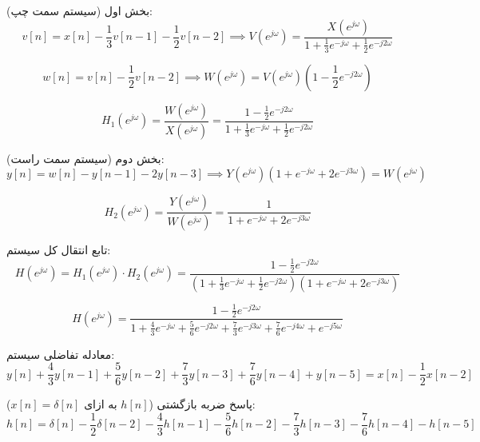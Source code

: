 {بخش اول (سیستم سمت چپ):}
\[v[n] = x[n] - \frac{1}{3}v[n-1] - \frac{1}{2}v[n-2] \implies V(e^{j\omega}) = \frac{X(e^{j\omega})}{1 + \frac{1}{3}e^{-j\omega} + \frac{1}{2}e^{-j2\omega}}\]

\[w[n] = v[n] - \frac{1}{2}v[n-2] \implies W(e^{j\omega}) = V(e^{j\omega}) \left(1 - \frac{1}{2}e^{-j2\omega}\right)\]

\[H_1(e^{j\omega}) = \frac{W(e^{j\omega})}{X(e^{j\omega})} = \frac{1 - \frac{1}{2}e^{-j2\omega}}{1 + \frac{1}{3}e^{-j\omega} + \frac{1}{2}e^{-j2\omega}}\]

{بخش دوم (سیستم سمت راست):}
\[y[n] = w[n] - y[n-1] - 2y[n-3] \implies Y(e^{j\omega}) \left(1 + e^{-j\omega} + 2e^{-j3\omega}\right) = W(e^{j\omega})\]

\[H_2(e^{j\omega}) = \frac{Y(e^{j\omega})}{W(e^{j\omega})} = \frac{1}{1 + e^{-j\omega} + 2e^{-j3\omega}}\]

{تابع انتقال کل سیستم:}
\[H(e^{j\omega}) = H_1(e^{j\omega}) \cdot H_2(e^{j\omega}) = \frac{1 - \frac{1}{2}e^{-j2\omega}}{\left(1 + \frac{1}{3}e^{-j\omega} + \frac{1}{2}e^{-j2\omega}\right)\left(1 + e^{-j\omega} + 2e^{-j3\omega}\right)}\]

\[H(e^{j\omega}) = \frac{1 - \frac{1}{2}e^{-j2\omega}}{1 + \frac{4}{3}e^{-j\omega} + \frac{5}{6}e^{-j2\omega} + \frac{7}{3}e^{-j3\omega} + \frac{7}{6}e^{-j4\omega} + e^{-j5\omega}}\]

{معادله تفاضلی سیستم:}
\[y[n] + \frac{4}{3}y[n-1] + \frac{5}{6}y[n-2] + \frac{7}{3}y[n-3] + \frac{7}{6}y[n-4] + y[n-5] = x[n] - \frac{1}{2}x[n-2]\]

{پاسخ ضربه بازگشتی ($h[n]$ به ازای $x[n] = \delta[n]$):}
\[h[n] = \delta[n] - \frac{1}{2}\delta[n-2] - \frac{4}{3}h[n-1] - \frac{5}{6}h[n-2] - \frac{7}{3}h[n-3] - \frac{7}{6}h[n-4] - h[n-5]\]

